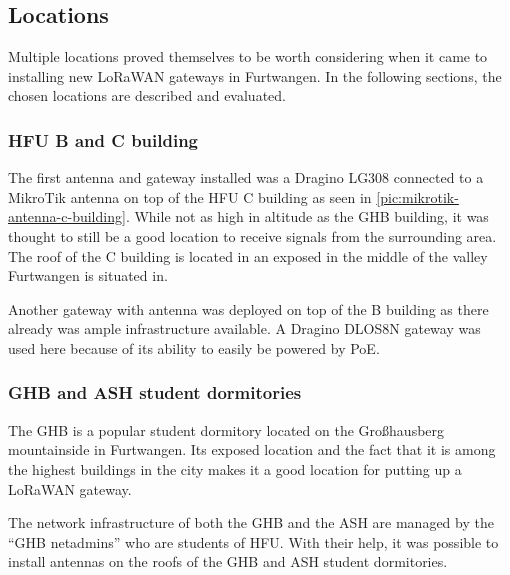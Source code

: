 \subsection{Locations}


Multiple locations proved themselves to be worth considering when it came to installing new \ac{LoRaWAN} gateways in Furtwangen.
In the following sections, the chosen locations are described and evaluated.

\subsubsection{\ac{HFU} B and C building}


The first antenna and gateway installed was a Dragino LG308 connected to a MikroTik antenna on top of the \ac{HFU} C building as seen in \cref{pic:mikrotik-antenna-c-building}.
While not as high in altitude as the \ac{GHB} building, it was thought to still be a good location to receive signals from the surrounding area.
The roof of the C building is located in an exposed in the middle of the valley Furtwangen is situated in.

Another gateway with antenna was deployed on top of the B building as there already was ample infrastructure available.
A Dragino DLOS8N gateway was used here because of its ability to easily be powered by \ac{PoE}.

\subsubsection{\acf{GHB} and \acf{ASH} student dormitories}

The \ac{GHB} is a popular student dormitory located on the Großhausberg mountainside in Furtwangen.
Its exposed location and the fact that it is among the highest buildings in the city makes it a good location for putting up a \ac{LoRaWAN} gateway.

The network infrastructure of both the \ac{GHB} and the \ac{ASH} are managed by the ``\ac{GHB} netadmins'' who are students of \ac{HFU}.
With their help, it was possible to install antennas on the roofs of the \ac{GHB} and \ac{ASH} student dormitories.

